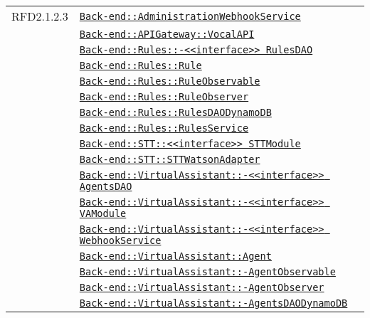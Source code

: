 \begin{longtable}{|>{\centering}m{3cm}|m{10cm}<{\centering}|}
RFD2.1.2.3 & \hyperref[Back-end::AdministrationWebhookService]{\texttt{Back-end::AdministrationWebhookService}}\\
& \hyperref[Back-end::APIGateway::VocalAPI]{\texttt{Back-end::APIGateway::VocalAPI}}\\
& \hyperref[Back-end::Rules::<<interface>> RulesDAO]{\texttt{Back-end::Rules::-\linebreak <<interface>> RulesDAO}}\\
& \hyperref[Back-end::Rules::Rule]{\texttt{Back-end::Rules::Rule}}\\
& \hyperref[Back-end::Rules::RuleObservable]{\texttt{Back-end::Rules::RuleObservable}}\\
& \hyperref[Back-end::Rules::RuleObserver]{\texttt{Back-end::Rules::RuleObserver}}\\
& \hyperref[Back-end::Rules::RulesDAODynamoDB]{\texttt{Back-end::Rules::RulesDAODynamoDB}}\\
& \hyperref[Back-end::Rules::RulesService]{\texttt{Back-end::Rules::RulesService}}\\
& \hyperref[Back-end::STT::<<interface>> STTModule]{\texttt{Back-end::STT::<<interface>> STTModule}}\\
& \hyperref[Back-end::STT::STTWatsonAdapter]{\texttt{Back-end::STT::STTWatsonAdapter}}\\
& \hyperref[Back-end::VirtualAssistant::<<interface>> AgentsDAO]{\texttt{Back-end::VirtualAssistant::-\linebreak <<interface>> AgentsDAO}}\\
& \hyperref[Back-end::VirtualAssistant::<<interface>> VAModule]{\texttt{Back-end::VirtualAssistant::-\linebreak <<interface>> VAModule}}\\
& \hyperref[Back-end::VirtualAssistant::<<interface>> WebhookService]{\texttt{Back-end::VirtualAssistant::-\linebreak <<interface>> WebhookService}}\\
& \hyperref[Back-end::VirtualAssistant::Agent]{\texttt{Back-end::VirtualAssistant::Agent}}\\
& \hyperref[Back-end::VirtualAssistant::AgentObservable]{\texttt{Back-end::VirtualAssistant::-\linebreak AgentObservable}}\\
& \hyperref[Back-end::VirtualAssistant::AgentObserver]{\texttt{Back-end::VirtualAssistant::-\linebreak AgentObserver}}\\
& \hyperref[Back-end::VirtualAssistant::AgentsDAODynamoDB]{\texttt{Back-end::VirtualAssistant::-\linebreak AgentsDAODynamoDB}}\\

\end{longtable}
